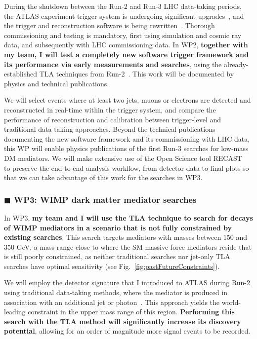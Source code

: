 \documentclass[11pt,a4paper]{article}
\begin{document}
During the shutdown between the Run-2 and Run-3 LHC data-taking periods, the ATLAS experiment trigger system is undergoing significant upgrades~\cite{Aad:1602235}, and the trigger and reconstruction software is being rewritten~\cite{Bielski:2674286}. %
Thorough commissioning and testing is mandatory, first using simulation and cosmic ray data, and subsequently with LHC commissioning data. 
In WP2, \textbf{together with my team, I will test a completely new software trigger framework and its performance via early measurements and searches}, using the already-established TLA techniques from Run-2~\cite{Aaboud:2018fzt}. This work will be documented by physics and technical publications.  

We will select events where at least two jets, muons or electrons are detected and reconstructed in real-time within the trigger system, and compare the performance of reconstruction and calibration between trigger-level and traditional data-taking approaches. 
Beyond the technical publications documenting the new software framework and its commissioning with LHC data, this WP will enable physics publications of the first Run-3 searches for low-mass DM mediators. 
We will make extensive use of the Open Science tool RECAST~\cite{Schuy:2019awp} to preserve the end-to-end analysis workflow, from detector data to final plots so that we can take advantage of this work for the searches in WP3.  

\subsubsection*{\color{yellow} $\blacksquare$ \color{black} WP3: WIMP dark matter mediator searches}

In WP3, \textbf{my team and I will use the TLA technique to search for decays of WIMP mediators in a scenario that is not fully constrained by existing searches}.
This search targets mediators with masses between 150 and 350 GeV, a mass range close to where the SM massive force mediators reside that is still poorly constrained, as neither traditional searches nor jet-only TLA searches have optimal sensitivity (see Fig.~\ref{fig:pastFutureConstraints}).  

We will employ the detector signature that I introduced to ATLAS during Run-2 using traditional data-taking methods, where the mediator is produced in association with an additional jet or photon~\cite{Aaboud:2019zxd}. 
This approach yields the world-leading constraint in the upper mass range of this region. 
\textbf{Performing this search with the TLA method will significantly increase its discovery potential}, 
allowing for an order of magnitude more signal events to be recorded.%
\end{document}
